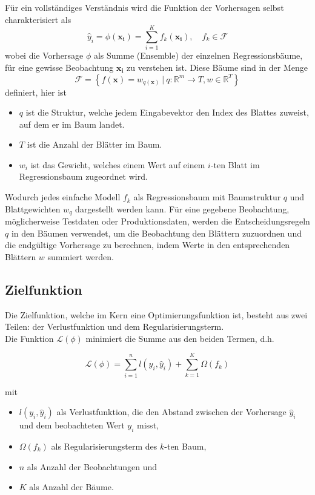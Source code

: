 \documentclass[12pt,titlepage,oneside]{book}
\begin{document}
Für ein vollständiges Verständnis wird die Funktion der Vorhersagen selbst charakterisiert als
\begin{equation}
    \hat{y}_i = \phi(\mathbf{x_i}) = \sum_{i=1}^K f_k(\mathbf{x_i}), \quad f_k \in \mathcal{F}
\end{equation}
wobei die Vorhersage $\phi$ als Summe (Ensemble) der einzelnen Regressionsbäume, für eine gewisse Beobachtung $\mathbf{x_i}$ zu verstehen ist. Diese Bäume sind in der Menge  
\begin{equation}
\mathcal{F}=\left\{f(\mathbf{x})=w_{q(\mathbf{x})} ~|~ q: \mathbb{R}^m \rightarrow T, w \in \mathbb{R}^T\right\}
\end{equation}
definiert, hier ist
\begin{itemize}
    \item $q$ ist die Struktur, welche jedem Eingabevektor den Index des Blattes zuweist, auf dem er im Baum landet.
    \item $T$ ist die Anzahl der Blätter im Baum.
    \item $w_i$ ist das Gewicht, welches einem Wert auf einem $i$-ten Blatt im Regressionsbaum zugeordnet wird.
\end{itemize}
Wodurch jedes einfache Modell $f_k$ als Regressionsbaum mit Baumstruktur $q$ und Blattgewichten $w_q$ dargestellt werden kann. Für eine gegebene Beobachtung, möglicherweise Testdaten oder Produktionsdaten, werden die Entscheidungsregeln $q$ in den Bäumen verwendet, um die Beobachtung den Blättern zuzuordnen und die endgültige Vorhersage zu berechnen, indem Werte in den entsprechenden Blättern $w$ summiert werden.



											


\subsection{Zielfunktion}

Die Zielfunktion, welche im Kern eine Optimierungsfunktion ist, besteht aus zwei Teilen: der Verlustfunktion und dem Regularisierungsterm.\\

Die Funktion $\mathcal{L}(\phi)$ minimiert die Summe aus den beiden Termen, d.h.

\begin{equation}
\mathcal{L}(\phi) = \sum_{i=1}^n l(y_i, \hat{y}_i) + \sum_{k=1}^K \Omega(f_k)
\end{equation}

mit
\begin{itemize}
    \item $l(y_i, \hat{y}_i)$ als Verlustfunktion, die den Abstand zwischen der Vorhersage $\hat{y}_i$ und dem beobachteten Wert $y_i$ misst,
    \item $\Omega(f_k)$ als Regularisierungsterm des $k$-ten Baum,
    \item $n$ als Anzahl der Beobachtungen und
    \item $K$ als Anzahl der Bäume.
\end{itemize}
\end{document}
